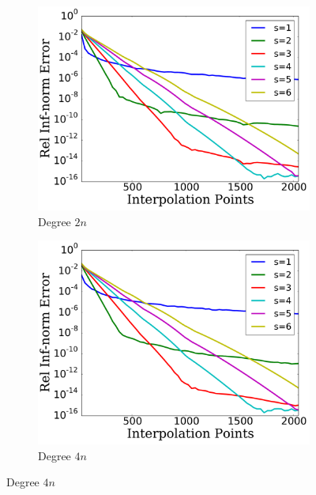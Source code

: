 
\begin{figure}[p]
    \centering
    \begin{subfigure}{0.45\textwidth}
    \includegraphics[width=\textwidth]{plots/msn_interp_fast_2n_rough_heaviside_2.pdf}
    \caption{Degree $2n$}
    \end{subfigure}
    \begin{subfigure}{0.45\textwidth}
    \includegraphics[width=\textwidth]{plots/msn_interp_fast_4n_rough_heaviside_2.pdf}
    \caption{Degree $4n$}
    \end{subfigure}


\end{figure}
